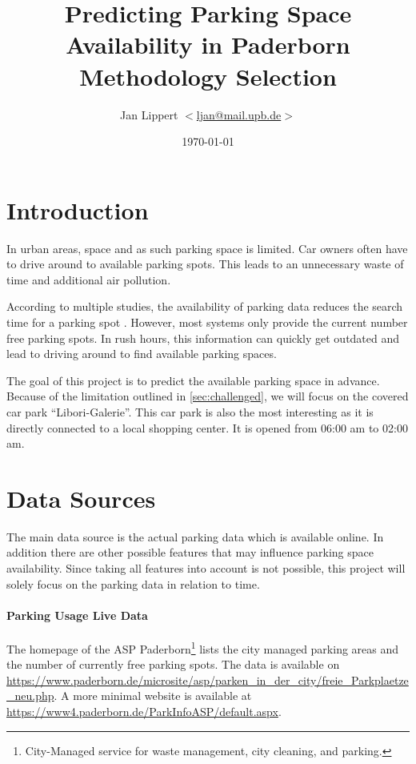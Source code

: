 \documentclass[journal,10pt]{IEEEtran}
\title{Predicting Parking Space Availability in Paderborn\\
Methodology Selection}
\author{Jan Lippert \(<\)\href{mailt:ljan@mail.upb.de}{ljan@mail.upb.de}\(>\)}
\date{\today}
\begin{document}
\maketitle

\section{Introduction}

In urban areas, space and as such parking space is limited. Car owners often have to drive around to available parking spots. This leads to an unnecessary waste of time and additional air pollution. 

According to multiple studies, the availability of parking data reduces the search time for a parking spot \cite{Asakura1994}\cite{Caicedo2010228}. However, most systems only provide the current number free parking spots. In rush hours, this information can quickly get outdated and lead to driving around to find available parking spaces.

The goal of this project is to predict the available parking space in advance. Because of the limitation outlined in \ref{sec:challenged}, we will focus on the covered car park ``Libori-Galerie''. This car park is also the most interesting as it is directly connected to a local shopping center. It is opened from 06:00 am to 02:00 am.

\section{Data Sources}\label{data sources}
The main data source is the actual parking data which is available online. In addition there are other possible features that may influence parking space availability. Since taking all features into account is not possible, this project will solely focus on the parking data in relation to time. 

\paragraph{Parking Usage Live Data}
The homepage of the ASP Paderborn\footnote{City-Managed service for waste management, city cleaning, and parking.} lists the city managed parking areas and the number of currently free parking spots. 
The data is available on \url{https://www.paderborn.de/microsite/asp/parken_in_der_city/freie_Parkplaetze_neu.php}. A more minimal website is available at \url{https://www4.paderborn.de/ParkInfoASP/default.aspx}. 
\end{document}

